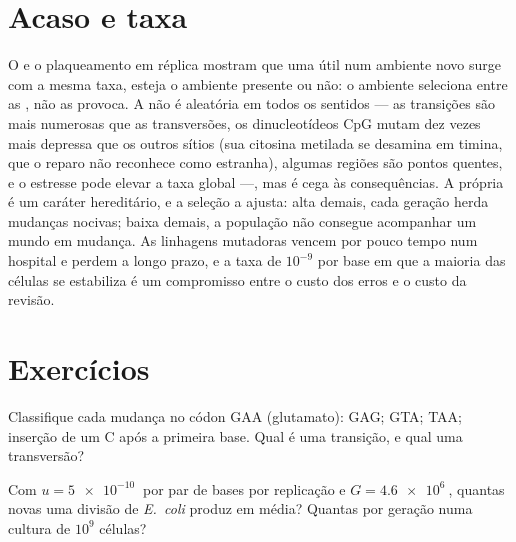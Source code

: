 \section{Acaso e taxa}

\begin{proposition}\label{prop:b2:genome-diversification:random}
O  e o plaqueamento em réplica mostram que uma
 útil num ambiente novo surge com a mesma taxa, esteja o
ambiente presente ou não: o ambiente seleciona entre as , não
as provoca. A  não é aleatória em todos os sentidos --- as
transições são mais numerosas que as transversões, os dinucleotídeos
CpG mutam dez vezes mais depressa que os outros sítios (sua citosina
metilada se desamina em timina, que o reparo não reconhece como
estranha), algumas regiões são pontos quentes, e o estresse pode
elevar a taxa global ---, mas é cega às consequências. A própria  é um caráter hereditário, e a seleção a ajusta: alta
demais, cada geração herda mudanças nocivas; baixa demais, a população
não consegue acompanhar um mundo em mudança. As linhagens mutadoras
vencem por pouco tempo num hospital e perdem a longo prazo, e a taxa de
$10^{-9}$ por base em que a maioria das células se estabiliza é um
compromisso entre o custo dos erros e o custo da revisão.
\end{proposition}

\section{Exercícios}

\begin{exercise}[$\star$]\label{exo:b2:genome-diversification:1}
Classifique cada mudança no códon GAA (glutamato): GAG; GTA; TAA;
inserção de um C após a primeira base. Qual é uma transição, e qual
uma transversão?
\end{exercise}

\begin{exercise}[$\star$]\label{exo:b2:genome-diversification:2}
Com $u = \qty{5e-10}{}$ por par de bases por replicação e $G =
\qty{4.6e6}{}$, quantas  novas uma divisão de \emph{E.~coli}
produz em média? Quantas por geração numa cultura de
$10^{9}$ células?
\end{exercise}

